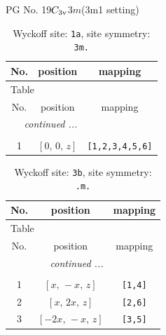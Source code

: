 \documentclass[fleqn,8pt]{jsarticle}
\begin{document}
\setcounter{MaxMatrixCols}{32}

\renewcommand{\tablename}{Table~}
\renewcommand{\figurename}{Figure~}
\begin{center}
\LARGE
PG No. 19\quad$C_{\rm 3v}$\quad$3m$\quad(3m1 setting)\quad[ trigonal ]
\end{center}
\renewcommand{\arraystretch}{1.2}
\begin{longtable}{ccc}
\caption{Wyckoff site: {\tt 1a}, site symmetry: {\tt 3m.}}
 \\
 \hline \hline
No. & position & mapping \\ \hline \endfirsthead

\multicolumn{2}{l}{\tablename\ \thetable{}} \\
 \hline \hline
No. & position & mapping \\ \hline \endhead

 \hline \hline
\multicolumn{2}{r}{\footnotesize\it continued ...} \\ \endfoot

 \hline \hline
\multicolumn{2}{r}{} \\ \endlastfoot

1 & $\left[ 0,\, 0,\, z \right]$ & {\tt [1,2,3,4,5,6]} \\
\end{longtable}
\renewcommand{\arraystretch}{1.2}
\begin{longtable}{ccc}
\caption{Wyckoff site: {\tt 3b}, site symmetry: {\tt .m.}}
 \\
 \hline \hline
No. & position & mapping \\ \hline \endfirsthead

\multicolumn{2}{l}{\tablename\ \thetable{}} \\
 \hline \hline
No. & position & mapping \\ \hline \endhead

 \hline \hline
\multicolumn{2}{r}{\footnotesize\it continued ...} \\ \endfoot

 \hline \hline
\multicolumn{2}{r}{} \\ \endlastfoot

1 & $\left[ x,\, - x,\, z \right]$ & {\tt [1,4]} \\ \hline
2 & $\left[ x,\, 2 x,\, z \right]$ & {\tt [2,6]} \\ \hline
3 & $\left[ - 2 x,\, - x,\, z \right]$ & {\tt [3,5]} \\
\end{longtable}
\renewcommand{\arraystretch}{1.2}
\end{document}
